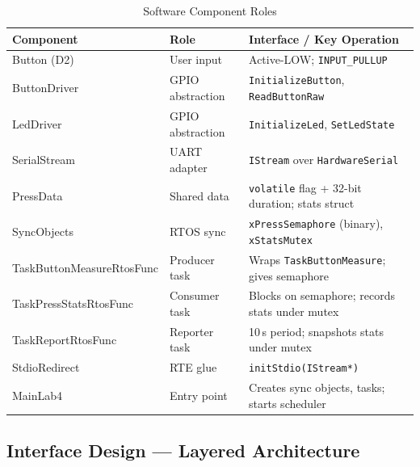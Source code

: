 \documentclass[12pt]{article}
\begin{document}
\begin{table}[H]
\centering
\begin{tabular}{@{}p{3.6cm}p{2.8cm}p{6.0cm}@{}}
\toprule
\textbf{Component} & \textbf{Role} & \textbf{Interface / Key Operation} \\
\midrule
Button (D2)                  & User input        & Active-LOW; \texttt{INPUT\_PULLUP} \\
ButtonDriver                 & GPIO abstraction   & \texttt{InitializeButton}, \texttt{ReadButtonRaw} \\
LedDriver                    & GPIO abstraction   & \texttt{InitializeLed}, \texttt{SetLedState} \\
SerialStream                 & UART adapter       & \texttt{IStream} over \texttt{HardwareSerial} \\
PressData                    & Shared data        & \texttt{volatile} flag + 32-bit duration; stats struct \\
SyncObjects                  & RTOS sync          & \texttt{xPressSemaphore} (binary), \texttt{xStatsMutex} \\
TaskButtonMeasureRtosFunc    & Producer task      & Wraps \texttt{TaskButtonMeasure}; gives semaphore \\
TaskPressStatsRtosFunc       & Consumer task      & Blocks on semaphore; records stats under mutex \\
TaskReportRtosFunc           & Reporter task      & 10\,s period; snapshots stats under mutex \\
StdioRedirect                & RTE glue           & \texttt{initStdio(IStream*)} \\
MainLab4                     & Entry point        & Creates sync objects, tasks; starts scheduler \\
\bottomrule
\end{tabular}
\caption{Software Component Roles}
\label{tab:components}
\end{table}

\subsection{Interface Design — Layered Architecture}
\end{document}

